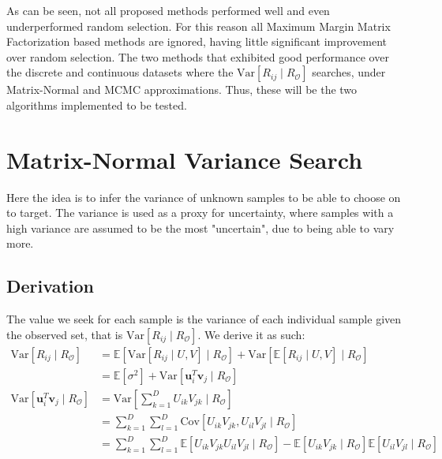 
As can be seen, not all proposed methods performed well and even underperformed random selection. For this reason all Maximum Margin Matrix Factorization based methods are ignored, having little significant improvement over random selection. The two methods that exhibited good performance over the discrete and continuous datasets where the $\mathrm{Var}[R_{ij} \mid R_\mathcal{O}]$ searches, under Matrix-Normal and MCMC approximations. Thus, these will be the two algorithms implemented to be tested.

\section{Matrix-Normal Variance Search}
\label{sec:mnvar}
Here the idea is to infer the variance of unknown samples to be able to choose on to target. The variance is used as a proxy for uncertainty, where samples with a high variance are assumed to be the most "uncertain", due to being able to vary more.
\subsection{Derivation}
The value we seek for each sample is the variance of each individual sample given the observed set, that is $\mathrm{Var}[R_{ij} \mid R_\mathcal{O}]$. We derive it as such:
\begin{align*}
\mathrm{Var}[R_{ij} \mid R_\mathcal{O}] &= \mathbb{E} [\mathrm{Var}[R_{ij} \mid U,V] \mid R_\mathcal{O}] + \mathrm{Var} [\mathbb{E}[R_{ij} \mid U,V] \mid R_\mathcal{O}]\\
&= \mathbb{E}[\sigma^2] + \mathrm{Var}[\mathbf{u}_i^T \mathbf{v}_j \mid R_\mathcal{O}] \\
\mathrm{Var}[\mathbf{u}_i^T \mathbf{v}_j \mid R_\mathcal{O}] &= \mathrm{Var}\left[\sum\limits_{k=1}^{D} U_{ik}V_{jk} \mid R_\mathcal{O}\right] \\
&= \sum\limits_{k=1}^{D} \sum\limits_{l=1}^{D} \mathrm{Cov}[U_{ik}V_{jk},U_{il}V_{jl} \mid R_\mathcal{O}] \\
&= \sum\limits_{k=1}^{D} \sum\limits_{l=1}^{D} \mathbb{E}[U_{ik}V_{jk}U_{il}V_{jl} \mid R_\mathcal{O}] - \mathbb{E}[U_{ik}V_{jk} \mid R_\mathcal{O}] \mathbb{E}[U_{il}V_{jl} \mid R_\mathcal{O}]\\
\end{align*}


